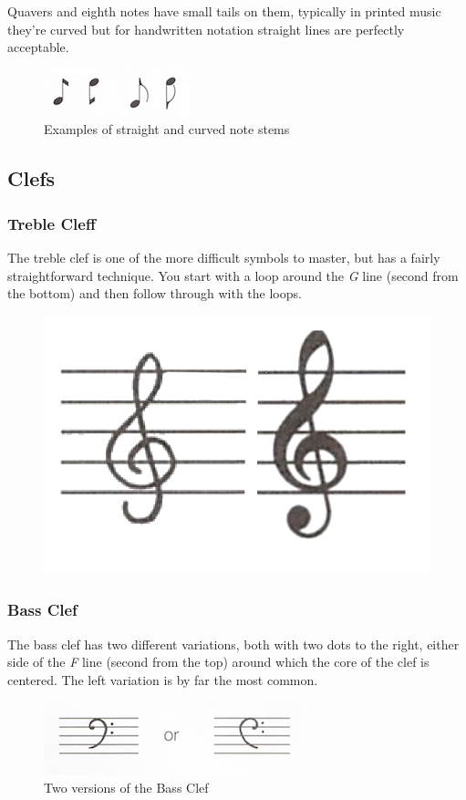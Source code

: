 Quavers and eighth notes have small tails on them, typically in printed music they're curved but for handwritten notation straight lines are perfectly acceptable.

\begin{figure}[h!]
  \includegraphics[width=0.4\linewidth]{gfx/basic/stems-curved.png}
  \centering
  \caption{Examples of straight and curved note stems}
  \label{fig:StemsStraightCurved}
\end{figure}

\subsection{Clefs}

\subsubsection{Treble Cleff}

The treble clef is one of the more difficult symbols to master, but has a fairly straightforward technique. You start with a loop around the \emph{G} line (second from the bottom) and then follow through with the loops.

\begin{figure}[h!]
  \includegraphics[width=0.3\linewidth]{gfx/basic/treble-clef.png}
  \centering
  \label{fig:TrebleClef}
\end{figure}

\subsubsection{Bass Clef}

The bass clef has two different variations, both with two dots to the right, either side of the \emph{F} line (second from the top) around which the core of the clef is centered. The left variation is by far the most common.

\begin{figure}[h!]
  \includegraphics[width=0.5\linewidth]{gfx/basic/bass-clef.png}
  \centering
  \caption{Two versions of the Bass Clef}
  \label{fig:BassClef}
\end{figure}

